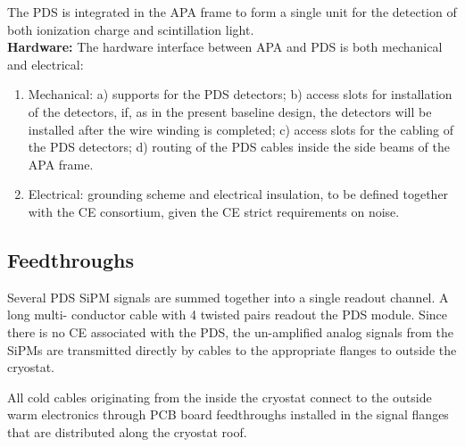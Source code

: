

The PDS is integrated in the APA frame to form a single unit for the detection of both ionization charge and scintillation light.\\

\textbf{Hardware:}
The hardware interface between APA and PDS is both mechanical and electrical: 
\begin{enumerate}
\item Mechanical: a) supports for the PDS detectors; b) access slots for installation of the detectors, if, as in the present baseline design, the detectors will be installed after the wire winding is completed; c) access slots for the cabling of the PDS detectors; d) routing of the PDS cables inside the side beams of the APA frame.
\item Electrical: grounding scheme and electrical insulation, to be defined together with the CE consortium, given the CE strict requirements on noise.
\end{enumerate}


\subsection{Feedthroughs}
\label{sec:fdsp-pd-intfc-feed}

Several PDS SiPM signals are summed together into a single readout channel. A long multi- conductor cable with 4 twisted pairs readout the PDS module. Since there is no CE associated with the PDS, the un-amplified analog signals from the SiPMs are transmitted directly by cables to the appropriate flanges to outside the cryostat. 

All cold cables originating from the inside the cryostat connect to the outside warm electronics through PCB board feedthroughs installed in the signal flanges that are distributed along the cryostat roof.

